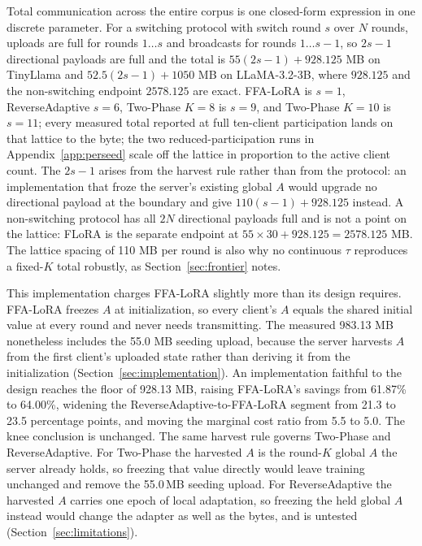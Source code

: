 \documentclass[iicol,pdflatex,sn-mathphys-num]{sn-jnl}
\begin{document}
Total communication across the entire corpus is one closed-form expression in one discrete parameter. For a switching protocol with switch round $s$ over $N$ rounds, uploads are full for rounds $1 \ldots s$ and broadcasts for rounds $1 \ldots s{-}1$, so $2s-1$ directional payloads are full and the total is $55(2s-1) + 928.125$ MB on TinyLlama and $52.5(2s-1) + 1050$ MB on LLaMA-3.2-3B, where $928.125$ and the non-switching endpoint $2578.125$ are exact. FFA-LoRA is $s{=}1$, ReverseAdaptive $s{=}6$, Two-Phase $K{=}8$ is $s{=}9$, and Two-Phase $K{=}10$ is $s{=}11$; every measured total reported at full ten-client participation lands on that lattice to the byte; the two reduced-participation runs in Appendix~\ref{app:perseed} scale off the lattice in proportion to the active client count. The $2s-1$ arises from the harvest rule rather than from the protocol: an implementation that froze the server's existing global $A$ would upgrade no directional payload at the boundary and give $110(s-1) + 928.125$ instead. A non-switching protocol has all $2N$ directional payloads full and is not a point on the lattice: FLoRA is the separate endpoint at $55 \times 30 + 928.125 = 2578.125$ MB. The lattice spacing of 110 MB per round is also why no continuous $\tau$ reproduces a fixed-$K$ total robustly, as Section~\ref{sec:frontier} notes.

This implementation charges FFA-LoRA slightly more than its design requires. FFA-LoRA freezes $A$ at initialization, so every client's $A$ equals the shared initial value at every round and never needs transmitting. The measured 983.13 MB nonetheless includes the 55.0 MB seeding upload, because the server harvests $A$ from the first client's uploaded state rather than deriving it from the initialization (Section~\ref{sec:implementation}). An implementation faithful to the design reaches the floor of 928.13 MB, raising FFA-LoRA's savings from 61.87\% to 64.00\%, widening the ReverseAdaptive-to-FFA-LoRA segment from 21.3 to 23.5 percentage points, and moving the marginal cost ratio from 5.5 to 5.0. The knee conclusion is unchanged. The same harvest rule governs Two-Phase and ReverseAdaptive. For Two-Phase the harvested $A$ is the round-$K$ global $A$ the server already holds, so freezing that value directly would leave training unchanged and remove the 55.0\,MB seeding upload. For ReverseAdaptive the harvested $A$ carries one epoch of local adaptation, so freezing the held global $A$ instead would change the adapter as well as the bytes, and is untested (Section~\ref{sec:limitations}).
\end{document}
